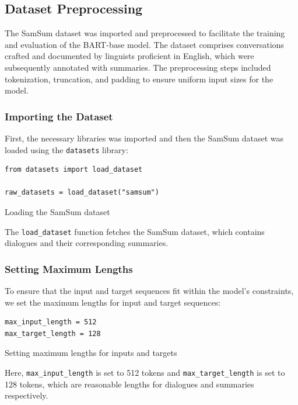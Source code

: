        \subsection{Dataset Preprocessing}

The SamSum dataset was imported and preprocessed to facilitate the training and evaluation of the BART-base model. The dataset comprises conversations crafted and documented by linguists proficient in English, which were subsequently annotated with summaries. The preprocessing steps included tokenization, truncation, and padding to ensure uniform input sizes for the model.

\subsubsection{Importing the Dataset}

First, the necessary libraries was imported and then the SamSum dataset was loaded using the \texttt{datasets} library:

\begin{listing}[H]
\begin{verbatim}
from datasets import load_dataset

raw_datasets = load_dataset("samsum")
\end{verbatim}
\caption{Loading the SamSum dataset}
\label{listing:Loading_SamSum}
\end{listing}

The \texttt{load\_dataset} function fetches the SamSum dataset, which contains dialogues and their corresponding summaries.

\subsubsection{Setting Maximum Lengths}

To ensure that the input and target sequences fit within the model's constraints, we set the maximum lengths for input and target sequences:

\begin{listing}[H]
\begin{verbatim}
max_input_length = 512
max_target_length = 128
\end{verbatim}
\caption{Setting maximum lengths for inputs and targets}
\label{listing:Max_Lengths}
\end{listing}

Here, \texttt{max\_input\_length} is set to 512 tokens and \texttt{max\_target\_length} is set to 128 tokens, which are reasonable lengths for dialogues and summaries respectively.

